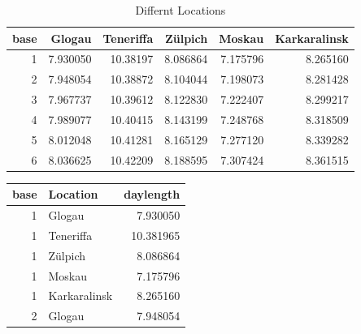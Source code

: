 \documentclass[
]{book}
\newenvironment{Shaded}{\begin{snugshade}}{\end{snugshade}}
\newcommand{\CommentTok}[1]{\textcolor[rgb]{0.56,0.35,0.01}{\textit{#1}}}
\newcommand{\DataTypeTok}[1]{\textcolor[rgb]{0.13,0.29,0.53}{#1}}
\newcommand{\DecValTok}[1]{\textcolor[rgb]{0.00,0.00,0.81}{#1}}
\newcommand{\KeywordTok}[1]{\textcolor[rgb]{0.13,0.29,0.53}{\textbf{#1}}}
\newcommand{\NormalTok}[1]{#1}
\newcommand{\OperatorTok}[1]{\textcolor[rgb]{0.81,0.36,0.00}{\textbf{#1}}}
\newcommand{\StringTok}[1]{\textcolor[rgb]{0.31,0.60,0.02}{#1}}
\begin{document}
\begin{table}

\caption{\label{tab:unnamed-chunk-14}Differnt Locations}
\fontsize{7}{9}\selectfont
\begin{tabular}[t]{r|r|r|r|r|r}
\hline
base & Glogau & Teneriffa & Zülpich & Moskau & Karkaralinsk\\
\hline
1 & 7.930050 & 10.38197 & 8.086864 & 7.175796 & 8.265160\\
\hline
2 & 7.948054 & 10.38872 & 8.104044 & 7.198073 & 8.281428\\
\hline
3 & 7.967737 & 10.39612 & 8.122830 & 7.222407 & 8.299217\\
\hline
4 & 7.989077 & 10.40415 & 8.143199 & 7.248768 & 8.318509\\
\hline
5 & 8.012048 & 10.41281 & 8.165129 & 7.277120 & 8.339282\\
\hline
6 & 8.036625 & 10.42209 & 8.188595 & 7.307424 & 8.361515\\
\hline
\end{tabular}
\end{table}

\begin{Shaded}
\end{Shaded}

\begingroup\fontsize{10}{12}\selectfont

\begin{tabular}{r|l|r}
\hline
base & Location & daylength\\
\hline
1 & Glogau & 7.930050\\
\hline
1 & Teneriffa & 10.381965\\
\hline
1 & Zülpich & 8.086864\\
\hline
1 & Moskau & 7.175796\\
\hline
1 & Karkaralinsk & 8.265160\\
\hline
2 & Glogau & 7.948054\\
\hline
\end{tabular}
\endgroup{}
\end{document}
